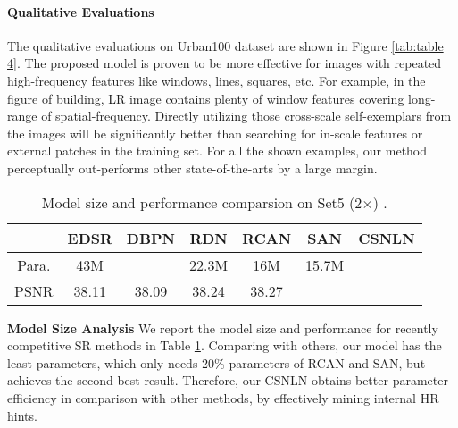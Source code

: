 \documentclass[10pt,twocolumn,letterpaper]{article}
\begin{document}
\paragraph{Qualitative Evaluations}
The qualitative evaluations on Urban100 dataset are shown in Figure \ref{tab:table 4}. The proposed model is proven to be more effective for images with repeated high-frequency features like windows, lines, squares, etc. For example, in the figure of building, LR image contains plenty of window features covering long-range of spatial-frequency. Directly utilizing those cross-scale self-exemplars from the images will be significantly better than searching for in-scale features or external patches in the training set. For all the shown examples, our method perceptually out-performs other state-of-the-arts by a large margin.
\begin{table}[h]
\footnotesize
\centering
    \begin{tabular}{|c|c|c|c|c|c|c|}
    \hline
        &EDSR & DBPN & RDN & RCAN & SAN & CSNLN \\
         \hline
         Para. & 43M & \color{blue}{10M} & 22.3M & 16M & 15.7M & \color{red}{3M}\\
         \hline
         PSNR & 38.11 & 38.09 & 38.24 & 38.27 & \color{red}{38.31} &\color{blue}{38.28}
         \\ \hline
    \end{tabular}
    \caption{Model size and performance comparsion on Set5 (2$\times$) .}
    \label{tab:table model}
\end{table}

\noindent\textbf{Model Size Analysis}
We report the model size and performance for recently competitive SR methods in Table \ref{tab:table model}. Comparing with others, our model has the least parameters, which only needs 20\% parameters of RCAN and SAN, but achieves the second best result. Therefore, our CSNLN obtains better parameter efficiency in comparison with other methods, by effectively mining internal HR hints. 
\end{document}
